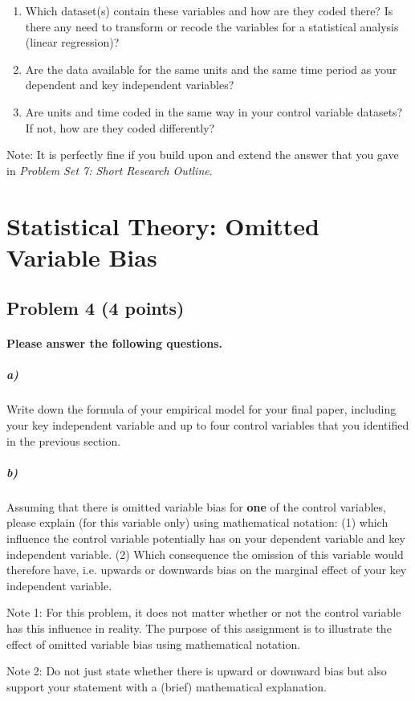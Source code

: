 \documentclass[12pt]{article}
\begin{document}
\begin{enumerate}
	\item Which dataset(s) contain these variables and how are they coded there? Is there any need to transform or recode the variables for a statistical analysis (linear regression)?
	\item Are the data available for the same units and the same time period as your dependent and key independent variables?
	\item Are units and time coded in the same way in your control variable datasets? If not, how are they coded differently?
\end{enumerate}

Note: It is perfectly fine if you build upon and extend the answer that you gave in \textit{Problem Set 7: Short Research Outline}.



\section*{Statistical Theory: Omitted Variable Bias}

\subsection*{Problem 4 (4 points)}

\paragraph{Please answer the following questions.}

\subparagraph{a)} Write down the formula of your empirical model for your final paper, including your key independent variable and up to four control variables that you identified in the previous section.

\subparagraph{b)} Assuming that there is omitted variable bias for \textbf{one} of the control variables, please explain (for this variable only) using mathematical notation: (1) which influence the control variable potentially has on your dependent variable and key independent variable. (2) Which consequence the omission of this variable would therefore have, i.e. upwards or downwards bias on the marginal effect of your key independent variable.

Note 1: For this problem, it does not matter whether or not the control variable has this influence in reality. The purpose of this assignment is to illustrate the effect of omitted variable bias using mathematical notation.

Note 2: Do not just state whether there is upward or downward bias but also support your statement with a (brief) mathematical explanation.
\end{document}
